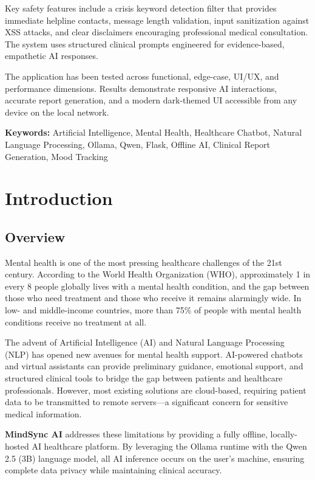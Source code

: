 \documentclass[12pt,a4paper]{report}
\begin{document}
Key safety features include a crisis keyword detection filter that provides immediate helpline contacts, message length validation, input sanitization against XSS attacks, and clear disclaimers encouraging professional medical consultation. The system uses structured clinical prompts engineered for evidence-based, empathetic AI responses.

The application has been tested across functional, edge-case, UI/UX, and performance dimensions. Results demonstrate responsive AI interactions, accurate report generation, and a modern dark-themed UI accessible from any device on the local network.

\vspace{0.5cm}
\noindent\textbf{Keywords:} Artificial Intelligence, Mental Health, Healthcare Chatbot, Natural Language Processing, Ollama, Qwen, Flask, Offline AI, Clinical Report Generation, Mood Tracking

\tableofcontents

\chapter{Introduction}

\section{Overview}

Mental health is one of the most pressing healthcare challenges of the 21st century. According to the World Health Organization (WHO), approximately 1 in every 8 people globally lives with a mental health condition, and the gap between those who need treatment and those who receive it remains alarmingly wide. In low- and middle-income countries, more than 75\% of people with mental health conditions receive no treatment at all.

The advent of Artificial Intelligence (AI) and Natural Language Processing (NLP) has opened new avenues for mental health support. AI-powered chatbots and virtual assistants can provide preliminary guidance, emotional support, and structured clinical tools to bridge the gap between patients and healthcare professionals. However, most existing solutions are cloud-based, requiring patient data to be transmitted to remote servers---a significant concern for sensitive medical information.

\textbf{MindSync AI} addresses these limitations by providing a fully offline, locally-hosted AI healthcare platform. By leveraging the Ollama runtime with the Qwen 2.5 (3B) language model, all AI inference occurs on the user's machine, ensuring complete data privacy while maintaining clinical accuracy.
\end{document}
